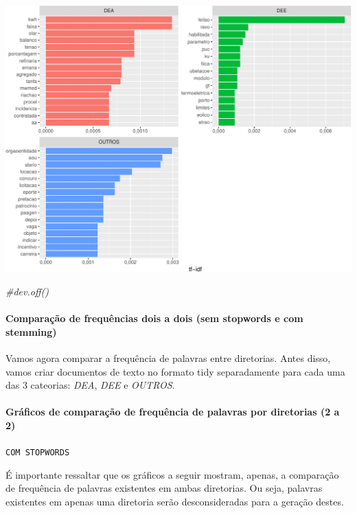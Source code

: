 \documentclass[]{article}
\newenvironment{Shaded}{\begin{snugshade}}{\end{snugshade}}
\newcommand{\CommentTok}[1]{\textcolor[rgb]{0.56,0.35,0.01}{\textit{#1}}}
\let\oldparagraph\paragraph
\renewcommand{\paragraph}[1]{\oldparagraph{#1}\mbox{}}
\begin{document}
\includegraphics{markdown_v40_files/figure-latex/03_freq_palavras_dir_nostop-1.pdf}

\begin{Shaded}
\begin{Highlighting}[]
\CommentTok{#dev.off()}
\end{Highlighting}
\end{Shaded}

\paragraph{Comparação de frequências dois a dois (sem stopwords e com
stemming)}\label{comparacao-de-frequencias-dois-a-dois-sem-stopwords-e-com-stemming}

Vamos agora comparar a frequência de palavras entre diretorias. Antes
disso, vamos criar documentos de texto no formato tidy separadamente
para cada uma das 3 cateorias: \emph{DEA}, \emph{DEE} e \emph{OUTROS}.

\paragraph{Gráficos de comparação de frequência de palavras por
diretorias (2 a
2)}\label{graficos-de-comparacao-de-frequencia-de-palavras-por-diretorias-2-a-2}

\texttt{COM\ STOPWORDS}

É importante ressaltar que os gráficos a seguir mostram, apenas, a
comparação de frequência de palavras existentes em ambas diretorias. Ou
seja, palavras existentes em apenas uma diretoria serão desconsideradas
para a geração destes.
\end{document}
